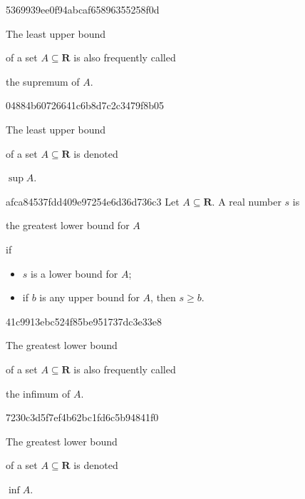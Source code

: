 \begin{note}{5369939ee0f94abcaf65896355258f0d}
    \begin{icloze}{2}The least upper bound\end{icloze} of a set \({ A \subseteq \mathbf{R} }\) is also frequently called \begin{icloze}{1}the supremum of \({ A }\).\end{icloze}
\end{note}

\begin{note}{04884b60726641c6b8d7c2c3479f8b05}
    \begin{icloze}{2}The least upper bound\end{icloze} of a set \({ A \subseteq \mathbf{R} }\) is denoted \begin{icloze}{1}\({ \sup A }\).\end{icloze}
\end{note}

\begin{note}{afca84537fdd409e97254e6d36d736c3}
    Let \({ A \subseteq \mathbf{R} }\). A real number \({ s }\) is \begin{icloze}{3}the greatest lower bound for \({ A }\)\end{icloze} if
    \begin{itemize}
        \item{} \begin{icloze}{2}\({ s }\) is a lower bound for \({ A }\);\end{icloze}
        \item{} \begin{icloze}{1}if \({ b }\) is any upper bound for \({ A }\), then \({ s \geq b }\).\end{icloze}
    \end{itemize}
\end{note}

\begin{note}{41c9913ebc524f85be951737dc3e33e8}
    \begin{icloze}{2}The greatest lower bound\end{icloze} of a set \({ A \subseteq \mathbf{R} }\) is also frequently called \begin{icloze}{1}the infimum of \({ A }\).\end{icloze}
\end{note}

\begin{note}{7230c3d5f7ef4b62bc1fd6c5b94841f0}
    \begin{icloze}{2}The greatest lower bound\end{icloze} of a set \({ A \subseteq \mathbf{R} }\) is denoted \begin{icloze}{1}\({ \inf A }\).\end{icloze}
\end{note}

